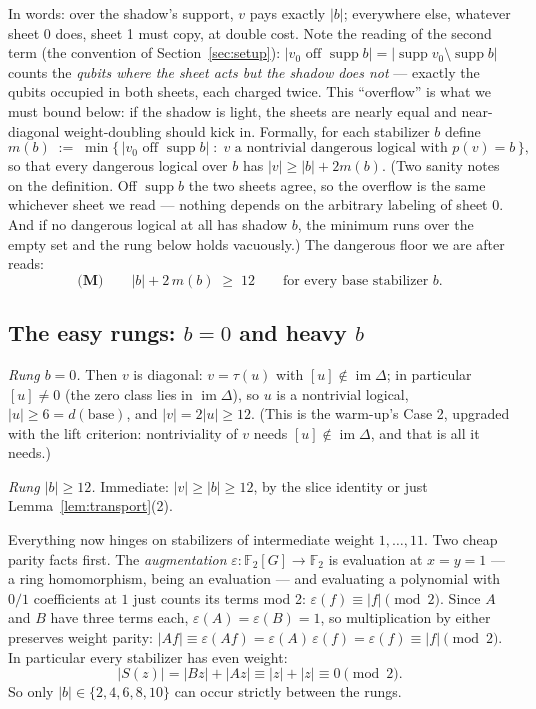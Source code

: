 \documentclass[11pt]{article}
\theoremstyle{plain}
\theoremstyle{definition}
\theoremstyle{remark}
\newcommand{\F}{\mathbb{F}}
\newcommand{\suppop}{\operatorname{supp}}
\newcommand{\imD}{\operatorname{im}\Delta}
\newcommand{\base}{\mathrm{base}}
\newcommand{\wt}[1]{\lvert #1\rvert}
\begin{document}
In words: over the shadow's support, $v$ pays exactly $\wt b$; everywhere
else, whatever sheet 0 does, sheet 1 must copy, at double cost. Note the
reading of the second term (the convention of Section~\ref{sec:setup}):
$\wt{v_0 \text{ off } \suppop b} = \lvert \suppop v_0 \setminus \suppop b
\rvert$ counts the \emph{qubits where the sheet acts but the shadow does
not} --- exactly the qubits occupied in both sheets, each charged twice.
This ``overflow'' is what we must bound below: if the shadow is light, the
sheets are nearly equal and near-diagonal weight-doubling should kick in. Formally, for each stabilizer $b$ define
\[
m(b) \;:=\; \min \bigl\{\, \wt{v_0 \text{ off } \suppop b} \;:\; v \text{ a
nontrivial dangerous logical with } p(v) = b \,\bigr\},
\]
so that every dangerous logical over $b$ has $\wt{v} \geq \wt{b} + 2m(b)$.
(Two sanity notes on the definition. Off $\suppop b$ the two sheets agree,
so the overflow is the same whichever sheet we read --- nothing depends on
the arbitrary labeling of sheet $0$. And if no dangerous logical at all has
shadow $b$, the minimum runs over the empty set and the rung below holds
vacuously.) The dangerous floor we are after reads:
\begin{equation}\label{eq:M}
\textbf{(M)}\qquad \wt{b} + 2\,m(b) \;\geq\; 12
\qquad\text{for every base stabilizer } b .
\end{equation}

\subsection{The easy rungs: \texorpdfstring{$b = 0$}{b=0} and heavy
\texorpdfstring{$b$}{b}}

\emph{Rung $b = 0$.} Then $v$ is diagonal: $v = \tau(u)$ with $[u] \notin
\imD$; in particular $[u] \neq 0$ (the zero class lies in $\imD$), so $u$ is
a nontrivial logical, $\wt{u} \geq 6 = d(\base)$, and $\wt{v} =
2\wt{u} \geq 12$. (This is the warm-up's Case 2, upgraded with the lift
criterion: nontriviality of $v$ needs $[u]\notin\imD$, and that is all it
needs.)

\emph{Rung $\wt{b} \geq 12$.} Immediate: $\wt{v} \geq \wt{b} \geq 12$, by the
slice identity or just Lemma~\ref{lem:transport}(2).

Everything now hinges on stabilizers of intermediate weight $1,\dots,11$. Two
cheap parity facts first. The \emph{augmentation} $\varepsilon : \F_2[G] \to
\F_2$ is evaluation at $x = y = 1$ --- a ring homomorphism, being an
evaluation --- and evaluating a polynomial with $0/1$ coefficients at $1$
just counts its terms mod 2: $\varepsilon(f) \equiv \wt{f} \pmod 2$. Since
$A$ and $B$ have three terms each, $\varepsilon(A) = \varepsilon(B) = 1$,
so multiplication by either preserves weight parity:
$\wt{Af} \equiv \varepsilon(Af) = \varepsilon(A)\,\varepsilon(f) =
\varepsilon(f) \equiv \wt{f} \pmod 2$. In particular every stabilizer has
even weight:
\[
\wt{S(z)} = \wt{Bz} + \wt{Az} \equiv \wt{z} + \wt{z} \equiv 0 \pmod 2 .
\]
So only $\wt{b} \in \{2,4,6,8,10\}$ can occur strictly between the rungs.
\end{document}
